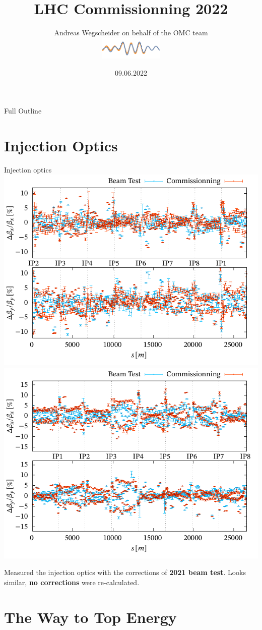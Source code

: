 \documentclass[11pt,usenames,dvipsnames,aspectratio=169]{beamer}
\author[OMC]{%
Andreas Wegscheider on behalf of the OMC team\\%
\centering%
\includegraphics[width=3cm]{omc-logo.pdf}%
}
\title[LHC 2022]{LHC Commissionning 2022}
\institute{CERN}
\date[09.06.22]{09.06.2022}
\newcommand{\highl}[1]{\textbf{#1}}
\begin{document}
\begin{frame}
    \titlepage
\end{frame}


\begin{frame}{Full Outline}
\tableofcontents
\end{frame}


\small

\section{Injection Optics}


\begin{frame}{Injection optics}
    \includegraphics[width=0.49\linewidth]{images/beamtest/b1_bb.pdf}
    \hfill
    \includegraphics[width=0.49\linewidth]{images/beamtest/b2_bb.pdf}
    
    Measured the injection optics with the corrections of \highl{2021 beam test}.
    Looks similar, \highl{no corrections} were re-calculated.
\end{frame}


\section{The Way to Top Energy}

\end{document}
